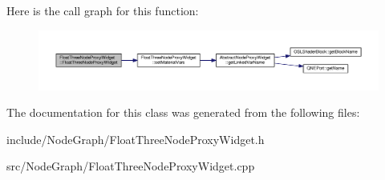 Here is the call graph for this function\-:
\nopagebreak
\begin{figure}[H]
\begin{center}
\leavevmode
\includegraphics[width=350pt]{class_float_three_node_proxy_widget_ac212c5dca46905943b440d47aef9816e_cgraph}
\end{center}
\end{figure}




The documentation for this class was generated from the following files\-:\begin{DoxyCompactItemize}
\item 
include/\-Node\-Graph/Float\-Three\-Node\-Proxy\-Widget.\-h\item 
src/\-Node\-Graph/Float\-Three\-Node\-Proxy\-Widget.\-cpp\end{DoxyCompactItemize}
